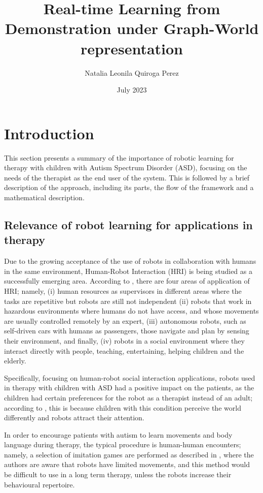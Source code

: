 \documentclass[thesis]{mas_proposal}
\title{Real-time Learning from Demonstration under Graph-World representation}
\author{Natalia Leonila Quiroga Perez}
\date{July 2023}
\begin{document}
\maketitle

\pagestyle{plain}

\section{Introduction}

	This section presents a summary of the importance of robotic learning for therapy with children with Autism Spectrum Disorder (ASD), focusing on the needs of the therapist as the end user of the system. This is followed by a brief description of the approach, including its parts, the flow of the framework and a mathematical description.

\subsection{Relevance of robot learning for applications in therapy}

    Due to the growing acceptance of the use of robots in collaboration with humans in the same environment, Human-Robot Interaction (HRI) is being studied as a successfully emerging area. According to \cite{Sheridan2016}, there are four areas of application of HRI; namely, (i) human resources as supervisors in different areas where the tasks are repetitive but robots are still not independent (ii) robots that work in hazardous environments where humans do not have access, and whose movements are usually controlled remotely by an expert, (iii) autonomous robots, such as self-driven cars with humans as passengers, those navigate and plan by sensing their environment, and finally, (iv) robots in a social environment where they interact directly with people, teaching, entertaining, helping children and the elderly.
    
    Specifically, focusing on human-robot social interaction applications, robots used in therapy with children with ASD had a positive impact on the patients, as the children had certain preferences for the robot as a therapist instead of an adult; according to \cite{Prabha2019}, this is because children with this condition perceive the world differently and robots attract their attention.
    
    In order to encourage patients with autism to learn movements and body language during therapy, the typical procedure is human-human encounters; namely, a selection of imitation games are performed as described in \cite{Dautenhahn2004}, where the authors are aware that robots have limited movements, and this method would be difficult to use in a long term therapy, unless the robots increase their behavioural repertoire.
    
\end{document}
